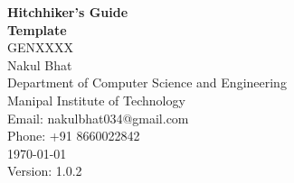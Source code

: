\newcommand{\titlepagebreak}{\\[1em]}
\begin{titlepage}
    \vspace*{\fill} %

    \centering
    {\Huge \bfseries Hitchhiker's Guide\titlepagebreak Template}\\[1in]
    
    {\Large GENXXXX}\\[0.75in]
    
    {\huge Nakul Bhat}\\[0.5in]
    
    {\large Department of Computer Science and Engineering \titlepagebreak Manipal Institute of Technology}\\[0.5in]
    
    {\large Email: nakulbhat034@gmail.com \titlepagebreak Phone: +91 8660022842}\\[1.5cm]
    
    {\large \today}\\[0.5cm]
    
    {\large Version: 1.0.2}

    \vspace*{\fill} %
\end{titlepage}
\restoregeometry